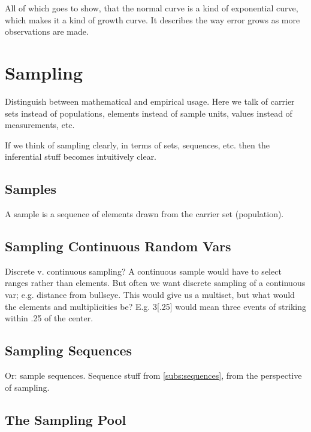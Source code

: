 All of which goes to show, that the normal curve is a kind of
exponential curve, which makes it a kind of growth curve.  It
describes the way error grows as more observations are made.


\chapter{Sampling}

\begin{remark}
  Distinguish between mathematical and empirical usage.  Here we talk
  of carrier sets instead of populations, elements instead of sample
  units, values instead of measurements, etc.

  If we think of sampling clearly, in terms of sets, sequences,
  etc. then the inferential stuff becomes intuitively clear.
\end{remark}

\section{Samples}

A sample is a sequence of elements drawn from the carrier set (population).

\section{Sampling Continuous Random Vars}

Discrete v. continuous sampling?  A continuous sample would have to
select ranges rather than elements.  But often we want discrete
sampling of a continuous var; e.g. distance from bullseye.  This would
give us a multiset, but what would the elements and multiplicities be?
E.g. {3[.25]} would mean three events of striking within .25 of the
center.

\section{Sampling Sequences}

\begin{remark}
  Or: sample sequences.  Sequence stuff from \ref{subs:sequences}, from the perspective of sampling.
\end{remark}

\section{The Sampling Pool}

